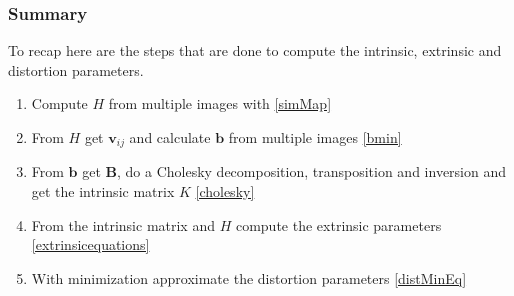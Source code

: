 \subsubsection{Summary}
To recap here are the steps that are done to compute the intrinsic, extrinsic and distortion parameters.
\begin{enumerate}
    \item Compute $H$ from multiple images with \ref{simMap}
    \item From $H$ get $\pmb{v}_{ij}$ and calculate $\pmb{b}$ from multiple images \ref{bmin} 
    \item From $\pmb{b}$ get $\pmb{B}$, do a Cholesky decomposition, transposition and inversion and get the intrinsic matrix $K$ \ref{cholesky}
    \item From the intrinsic matrix and $H$ compute the extrinsic parameters \ref{extrinsicequations}
    \item With minimization approximate the distortion parameters \ref{distMinEq}
\end{enumerate}